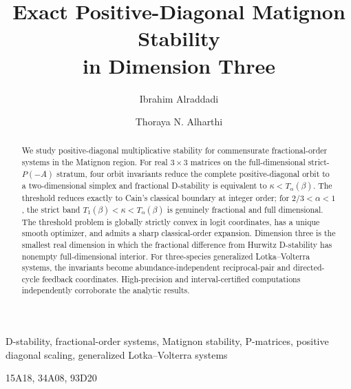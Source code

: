 \documentclass[hidelinks]{siamart251216}
\title{Exact Positive-Diagonal Matignon Stability\\in Dimension Three}
\author{Ibrahim Alraddadi \and Thoraya N. Alharthi}
\begin{document}
\maketitle
\begin{abstract}
We study positive-diagonal multiplicative stability for commensurate fractional-order systems in the Matignon region. For real \(3\times3\) matrices on the full-dimensional strict-\(P(-A)\) stratum, four orbit invariants reduce the complete positive-diagonal orbit to a two-dimensional simplex and fractional D-stability is equivalent to \(\kappa<T_\alpha(\beta)\). The threshold reduces exactly to Cain's classical boundary at integer order; for \(2/3<\alpha<1\), the strict band \(T_1(\beta)<\kappa<T_\alpha(\beta)\) is genuinely fractional and full dimensional. The threshold problem is globally strictly convex in logit coordinates, has a unique smooth optimizer, and admits a sharp classical-order expansion. Dimension three is the smallest real dimension in which the fractional difference from Hurwitz D-stability has nonempty full-dimensional interior. For three-species generalized Lotka--Volterra systems, the invariants become abundance-independent reciprocal-pair and directed-cycle feedback coordinates. High-precision and interval-certified computations independently corroborate the analytic results.
\end{abstract}
\begin{keywords}
D-stability, fractional-order systems, Matignon stability, P-matrices, positive diagonal scaling, generalized Lotka--Volterra systems
\end{keywords}
\begin{MSCcodes}
15A18, 34A08, 93D20
\end{MSCcodes}












\end{document}
